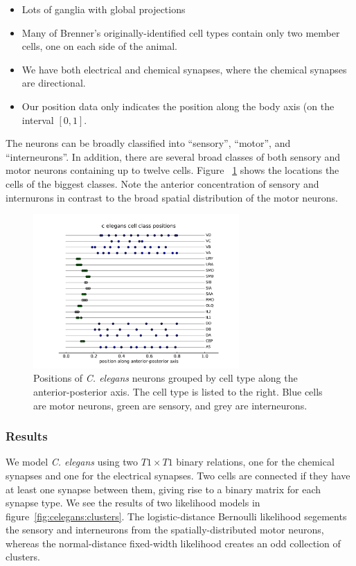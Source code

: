 \documentclass{article}
\begin{document}
\begin{itemize}
\item Lots of ganglia with global projections
\item Many of Brenner's originally-identified cell types contain only two member cells, one on each side of the animal. 
\item We have both electrical and chemical synapses, where the chemical synapses are directional. 
\item Our position data only indicates the position along the body axis (on the interval $[0, 1]$. 
\end{itemize}

The neurons can be broadly classified into ``sensory'', ``motor'', and
``interneurons''. In addition, there are several broad classes of both
sensory and motor neurons containing up to twelve cells. Figure ~\ref{fig:celegans:classestruth} shows the locations the cells of the biggest classes. Note the anterior concentration of sensory and internurons in contrast to the broad spatial distribution of the motor neurons. 

\begin{figure}
  \centering 
  \includegraphics[width=0.7\textwidth]{celegans/class.positions.pdf}
  \caption{Positions of \textit{C. elegans} neurons grouped by cell type along the anterior-posterior axis. The cell type is listed to the right. Blue cells are motor neurons, green are sensory, and grey are interneurons. }
  \label{fig:celegans:classestruth}
\end{figure}

\subsubsection{Results}
We model \textit{C. elegans} using two $T1\times T1$ binary relations, one for the chemical synapses and one for the electrical synapses. Two cells are connected if they have at least one synapse between them, giving rise to a binary matrix for each synapse type. We see the results of two likelihood models in figure~\ref{fig:celegans:clusters}. The logistic-distance Bernoulli likelihood segements the sensory and interneurons from the spatially-distributed motor neurons, whereas the normal-distance fixed-width likelihood  creates an odd collection of clusters. 
\end{document}
